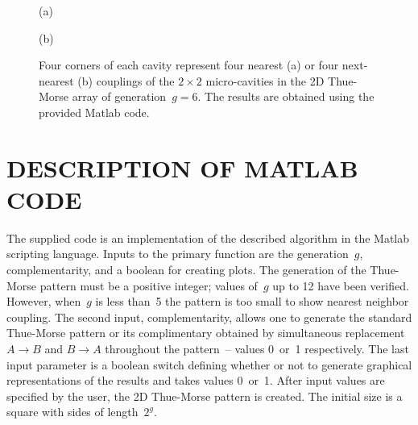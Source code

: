 \begin{figure}%
\begin{flushleft}
(a)
\end{flushleft}
\vskip -0.1in
\begin{flushleft}
(b)
\end{flushleft}
\vskip -0.1in
\caption[Four corners of each cavity represent four nearest (a) or four next-nearest (b) couplings of the $2\times 2$ micro-cavities in the 2D Thue-Morse array of generation $g=6$.]{\label{fig:couplings_Hamiltonian} Four corners of each cavity represent four nearest (a) or four next-nearest (b) couplings of the $2\times 2$ micro-cavities in the 2D Thue-Morse array of generation~$g=6$. The results are obtained using the provided Matlab code.}
\end{figure}

\section{DESCRIPTION OF MATLAB CODE}

The supplied code is an implementation of the described algorithm in the Matlab scripting language. Inputs to the primary function are the generation~$g$, complementarity, and a boolean for creating plots. The generation of the Thue-Morse pattern must be a positive integer; values of~$g$ up to 12 have been verified. However, when~$g$ is less than~5 the pattern is too small to show nearest neighbor coupling. The second input, complementarity, allows one to generate the standard Thue-Morse pattern or its complimentary obtained by simultaneous replacement $A\rightarrow B$ and $B\rightarrow A$ throughout the pattern~-- values 0~or~1 respectively. The last input parameter is a boolean switch defining whether or not to generate graphical representations of the results and takes values 0~or~1. After input values are specified by the user, the 2D Thue-Morse pattern is created. The initial size is a square with sides of length~$2^g$. 

